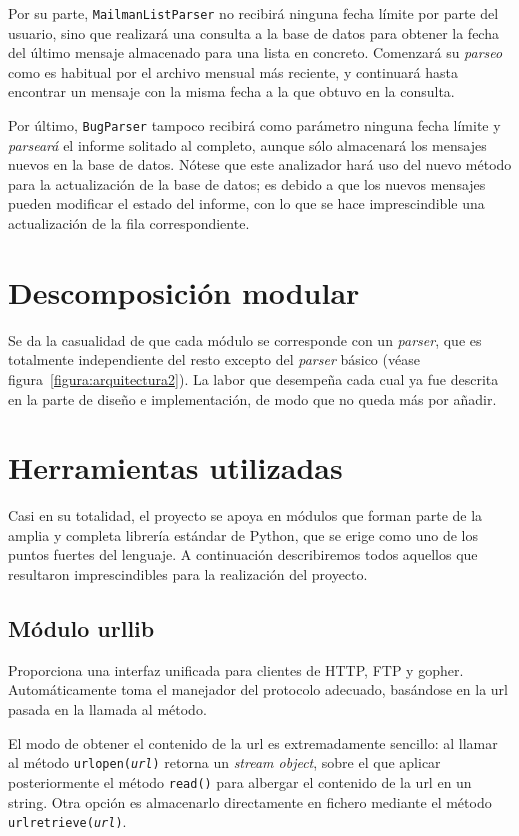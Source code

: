 Por su parte, \texttt{MailmanListParser} no recibirá ninguna fecha límite por
parte del usuario, sino que realizará una consulta a la base de datos para
obtener la fecha del último mensaje almacenado para una lista en concreto.
Comenzará su \textit{parseo} como es habitual por el archivo mensual más reciente,
y continuará hasta encontrar un mensaje con la misma fecha a la que obtuvo
en la consulta.

Por último, \texttt{BugParser} tampoco recibirá como parámetro ninguna fecha
límite y \textit{parseará} el informe solitado al completo, aunque sólo
almacenará los mensajes nuevos en la base de datos. Nótese que este analizador
hará uso del nuevo método para la actualización de la base de datos; es debido
a que los nuevos mensajes pueden modificar el estado del informe, con lo que
se hace imprescindible una actualización de la fila correspondiente.


\section{Descomposición modular}
Se da la casualidad de que cada módulo se corresponde con un \textit{parser},
que es totalmente independiente del resto excepto del \textit{parser} básico
(véase figura~\ref{figura:arquitectura2}).
La labor que desempeña cada cual ya fue descrita en la parte de diseño e
implementación, de modo que no queda más por añadir.



\section{Herramientas utilizadas}
Casi en su totalidad, el proyecto se apoya en módulos que forman parte de la
amplia y completa librería estándar de Python, que se erige como uno de los
puntos fuertes del lenguaje. A continuación describiremos todos aquellos que
resultaron imprescindibles para la realización del proyecto.


\subsection{Módulo urllib} \label{urllib}
Proporciona una interfaz unificada para clientes de HTTP, FTP y gopher.
Automáticamente toma el manejador del protocolo adecuado, basándose en la url
pasada en la llamada al método.

El modo de obtener el contenido de la url es extremadamente sencillo: al
llamar al método \texttt{urlopen(\textit{url})} retorna un \textit{stream object},
sobre el que aplicar posteriormente el método \texttt{read()} para albergar
el contenido de la url en un string. Otra opción es almacenarlo directamente
en fichero mediante el método \texttt{urlretrieve(\textit{url})}.

